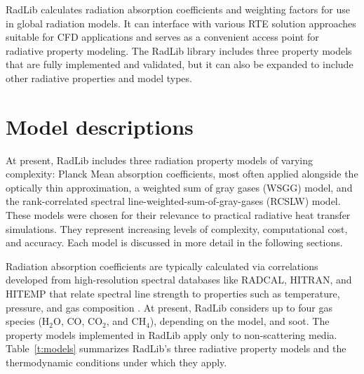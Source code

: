 \documentclass[preprint,12pt]{elsarticle}
\begin{document}
RadLib calculates radiation absorption coefficients and weighting factors for use in global radiation models. It can interface with various RTE solution approaches suitable for CFD applications and serves as a convenient access point for radiative property modeling. The RadLib library includes three property models that are fully implemented and validated, but it can also be expanded to include other radiative properties and model types.


\section{Model descriptions} \label{s:models}

At present, RadLib includes three radiation property models of varying complexity: Planck Mean absorption coefficients, most often applied alongside the optically thin approximation, a weighted sum of gray gases (WSGG) model, and the rank-correlated spectral line-weighted-sum-of-gray-gases (RCSLW) model. These models were chosen for their relevance to practical radiative heat transfer simulations. They represent increasing levels of complexity, computational cost, and accuracy. Each model is discussed in more detail in the following sections.

Radiation absorption coefficients are typically calculated via correlations developed from high-resolution spectral databases like RADCAL, HITRAN, and HITEMP \citep{Grosshandler_1993,Rothman_2010} that relate spectral line strength to properties such as temperature, pressure, and gas composition \citep{Zhang_2002b}. At present, RadLib considers up to four gas species (H$_2$O, CO, CO$_2$, and CH$_4$), depending on the model, and soot. The property models implemented in RadLib apply only to non-scattering media. Table~\ref{t:models} summarizes RadLib's three radiative property models and the thermodynamic conditions under which they apply.
\end{document}
